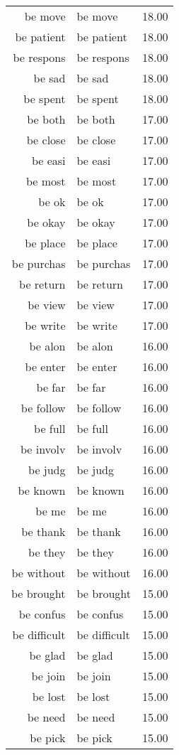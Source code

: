 \begin{table}[ht]
\begin{tabular}{rlr}
  be move & be move & 18.00 \\ 
  be patient & be patient & 18.00 \\ 
  be respons & be respons & 18.00 \\ 
  be sad & be sad & 18.00 \\ 
  be spent & be spent & 18.00 \\ 
  be both & be both & 17.00 \\ 
  be close & be close & 17.00 \\ 
  be easi & be easi & 17.00 \\ 
  be most & be most & 17.00 \\ 
  be ok & be ok & 17.00 \\ 
  be okay & be okay & 17.00 \\ 
  be place & be place & 17.00 \\ 
  be purchas & be purchas & 17.00 \\ 
  be return & be return & 17.00 \\ 
  be view & be view & 17.00 \\ 
  be write & be write & 17.00 \\ 
  be alon & be alon & 16.00 \\ 
  be enter & be enter & 16.00 \\ 
  be far & be far & 16.00 \\ 
  be follow & be follow & 16.00 \\ 
  be full & be full & 16.00 \\ 
  be involv & be involv & 16.00 \\ 
  be judg & be judg & 16.00 \\ 
  be known & be known & 16.00 \\ 
  be me & be me & 16.00 \\ 
  be thank & be thank & 16.00 \\ 
  be they & be they & 16.00 \\ 
  be without & be without & 16.00 \\ 
  be brought & be brought & 15.00 \\ 
  be confus & be confus & 15.00 \\ 
  be difficult & be difficult & 15.00 \\ 
  be glad & be glad & 15.00 \\ 
  be join & be join & 15.00 \\ 
  be lost & be lost & 15.00 \\ 
  be need & be need & 15.00 \\ 
  be pick & be pick & 15.00 \\ 

\end{tabular}
\end{table}

